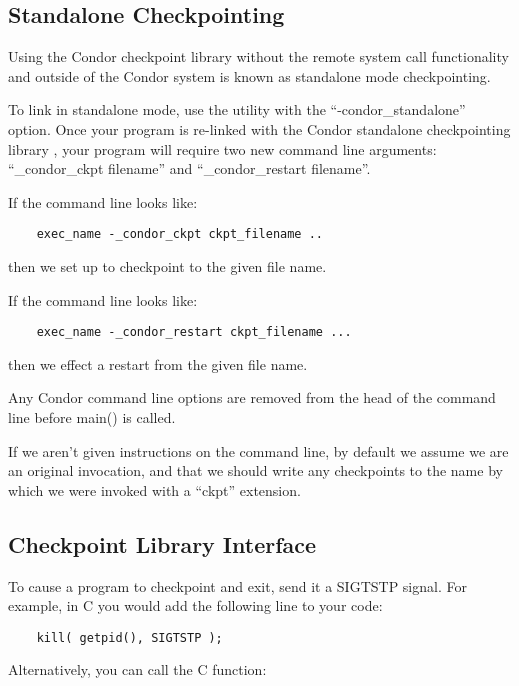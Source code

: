 \subsection{\label{sec:standalone-ckpt}Standalone Checkpointing}

Using the Condor checkpoint library without the remote system call
functionality and outside of the Condor system is known as standalone
mode checkpointing.

To link in standalone mode, use the  utility with the
``-condor\_standalone'' option.
Once your program is re-linked with the Condor standalone
checkpointing library , your program will
require two new command line arguments: ``\_condor\_ckpt filename''
and ``\_condor\_restart filename''.

If the command line looks like:

\begin{verbatim}
	exec_name -_condor_ckpt ckpt_filename ..
\end{verbatim}

then we set up to checkpoint to the given file name.

If the command line looks like:

\begin{verbatim}
	exec_name -_condor_restart ckpt_filename ...
\end{verbatim}

then we effect a restart from the given file name.

Any Condor command line options are removed from the head of the
command line before main() is called.

If we aren't given instructions on the command line, by default we
assume we are an original invocation, and that we should write any
checkpoints to the name by which we were invoked with a
``ckpt'' extension.

\subsection{\label{sec:ckpt-api}Checkpoint Library Interface}

To cause a program to checkpoint and exit, send it a SIGTSTP signal.  For 
example, in C you would add the following line to your code:

\begin{verbatim}
	kill( getpid(), SIGTSTP );
\end{verbatim}

Alternatively, you can call the C function:

